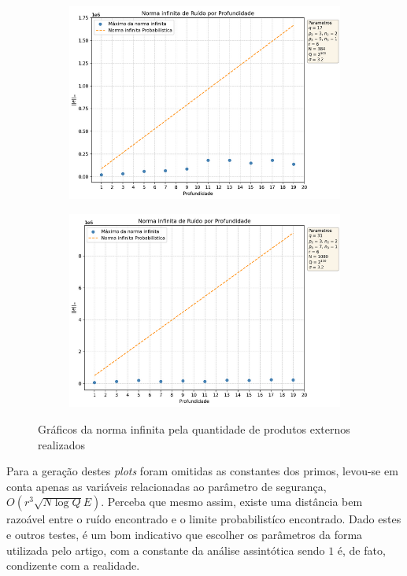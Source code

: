 \begin{figure}[H]
  \centering
  \begin{subfigure}{0.45\textwidth}
    \centering
    \includegraphics[width=\linewidth]{sections/images/image2.png}
  \end{subfigure}
  \hfill
  \begin{subfigure}{0.45\textwidth}
    \centering
    \includegraphics[width=\linewidth]{sections/images/image.png}
  \end{subfigure}
  \caption{Gráficos da norma infinita pela quantidade de produtos externos realizados }
\end{figure}

Para a geração destes \emph{plots} foram omitidas as constantes dos primos, levou-se em conta apenas as variáveis relacionadas ao parâmetro de segurança, $O(r^3\sqrt{N\log Q}E)$. Perceba que mesmo assim, existe uma distância bem razoável entre o ruído encontrado e o limite probabilistíco encontrado. Dado estes e outros testes, é um bom indicativo que escolher os parâmetros da forma utilizada pelo artigo, com a constante da análise assintótica sendo $1$ é, de fato, condizente com a realidade.


